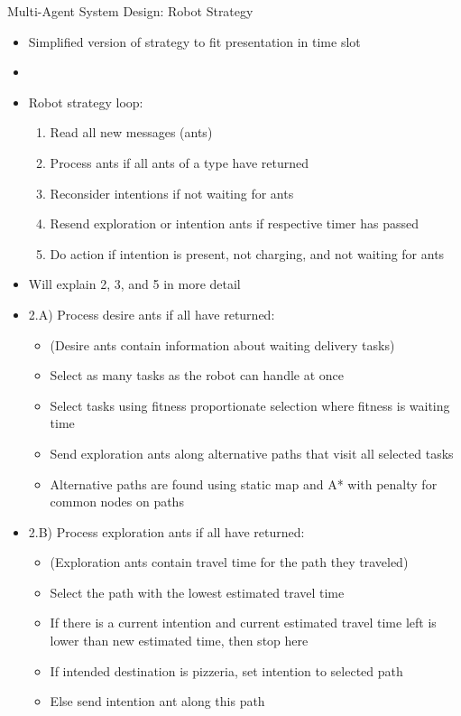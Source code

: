 \begin{frame}[allowframebreaks]{Multi-Agent System Design: Robot Strategy}
    \begin{itemize}
        \item Simplified version of strategy to fit presentation in time slot
        \item[]

        \item Robot strategy loop:
        \begin{enumerate}
            \item Read all new messages (ants)
            \item Process ants if all ants of a type have returned
            \item Reconsider intentions if not waiting for ants
            \item Resend exploration or intention ants if respective timer has passed
            \item Do action if intention is present, not charging, and not waiting for ants
        \end{enumerate}

        \item Will explain 2, 3, and 5 in more detail

        \framebreak

        \item 2.A) Process desire ants if all have returned:
        \begin{itemize}
            \item (Desire ants contain information about waiting delivery tasks)
            \item Select as many tasks as the robot can handle at once
            \item Select tasks using fitness proportionate selection where fitness is waiting time
            \item Send exploration ants along alternative paths that visit all selected tasks
            \item Alternative paths are found using static map and A* with penalty for common nodes on paths~\cite{alternativePaths}
        \end{itemize}

        \framebreak
        \item 2.B) Process exploration ants if all have returned:
        \begin{itemize}
            \item (Exploration ants contain travel time for the path they traveled)
            \item Select the path with the lowest estimated travel time
            \item If there is a current intention and current estimated travel time left is lower than new estimated time, then stop here
            \item If intended destination is pizzeria, set intention to selected path
            \item Else send intention ant along this path
        \end{itemize}


\end{itemize}
\end{frame}
